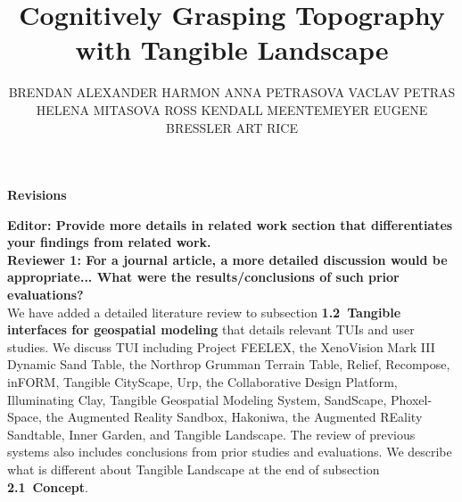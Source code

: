 \documentclass[prodmode,acmtochi]{acmsmall} %
\begin{document}

\title{Cognitively Grasping Topography with Tangible Landscape}
\author{BRENDAN ALEXANDER HARMON
ANNA PETRASOVA
VACLAV PETRAS
HELENA MITASOVA
ROSS ​KENDALL MEENTEMEYER
EUGENE BRESSLER
ART RICE
}

\maketitle

\textbf{Revisions}

\vspace*{3em}

%
%

\textbf{Editor: Provide more details in related work section 
that differentiates your findings from related work.} \\

\textbf{Reviewer 1: For a journal article, a more detailed discussion would be appropriate... What were the results/conclusions of such prior evaluations?} \\

We have added a detailed literature review to subsection 
\textbf{1.2~Tangible interfaces for geospatial modeling}
that details relevant TUIs and user studies.
We discuss TUI including 
Project FEELEX, 
the XenoVision Mark III Dynamic Sand Table,  
the Northrop Grumman Terrain Table, 
Relief, Recompose, inFORM, Tangible CityScape,
Urp, the Collaborative Design Platform, 
Illuminating Clay, Tangible Geospatial Modeling System, 
SandScape, Phoxel-Space, 
the Augmented Reality Sandbox,
Hakoniwa, the Augmented REality Sandtable,
Inner Garden, and Tangible Landscape. 
The review of previous systems also includes 
conclusions from prior studies and  evaluations.
We describe what is different about Tangible Landscape 
at the end of subsection \textbf{2.1~Concept}.\\

\hrulefill \\
\end{document}
